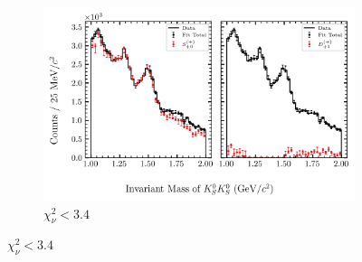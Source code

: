 \begin{figure}[htbp]
    \begin{subfigure}{0.8\textwidth}
        \includegraphics[width=\linewidth]{figures/binned_fit_chisqdof_3.4_splot_D_1s_2b_phase_factor_waves489_uncertainty_bootstrap-CI-BC.png}
        \caption{$\chi^2_\nu < 3.4$}
    \end{subfigure}

    \vspace{1em}


\end{figure}
